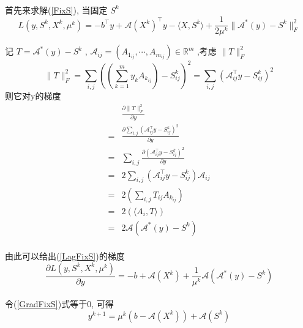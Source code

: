 \documentclass[UTF8]{ctexart}
\numberwithin{equation}{section}
\begin{document}
			\paragraph{}
				\quad 首先来求解(\ref{FixS}), 当固定 $S^k$
				\begin{equation}\label{LagFixS}
						L(y, S^k, X^k, \mu^k)
					=	-b^\top y + \mathcal{A}(X^k)^\top y - \langle{X, S^k}\rangle+ \frac{1}{2\mu^k} \lVert{\mathcal{A}^*(y) - S^k}\rVert^2_F
				\end{equation}

				记 $T = \mathcal{A}^*(y) - S^k$ , $\mathcal{A}_{ij} = (A_{1_{ij}}, \cdots, A_{m_{ij}}) \in \mathbb{R}^{m}$ ,考虑 $\lVert{T}\rVert^2_F$
				\[
						\lVert{T}\rVert^2_F
					=	\sum_{i, j}((\sum^m_{k = 1} y_k A_{k_{ij}}) - S^k_{ij})^2
					=	\sum_{i, j}(\mathcal{A}_{ij}^\top y - S^k_{ij})^2
				\]
				则它对y的梯度
				\begin{equation}
					\begin{aligned}
							& \frac{\partial \lVert{T}\rVert^2_F}{\partial y}\\
						=	& \frac{\partial \sum_{i, j}(\mathcal{A}_{ij}^\top y - S^k_{ij})^2}{\partial y}\\
						=	& \sum_{i, j}\frac{\partial (\mathcal{A}_{ij}^\top y - S^k_{ij})^2}{\partial y} \\
						=	& 2\sum_{i, j}(\mathcal{A}_{ij}^\top y - S^k_{ij}) \mathcal{A}_{ij}\\
						=	& 2(\sum_{i, j}T_{ij} A_{k_{ij}})\\
						=	& 2(\langle{A_i, T}\rangle)\\
						=	& 2\mathcal{A}(\mathcal{A}^*(y) - S^k)
					\end{aligned}
				\end{equation}

			\paragraph{}
				\quad 由此可以给出(\ref{LagFixS})的梯度
				\begin{equation}\label{GradFixS}
						\frac{\partial L(y, S^k, X^k, \mu^k)}{\partial y}
					=	-b + \mathcal{A}(X^k) + \frac{1}{\mu^k} \mathcal{A}(\mathcal{A}^*(y) - S^k)
				\end{equation}

			\paragraph{}
				\quad 令(\ref{GradFixS})式等于0, 可得
				\begin{equation}\label{dualAY}
					y^{k + 1} = \mu^k(b - \mathcal{A}(X^k)) + \mathcal{A}(S^k)
				\end{equation}
\end{document}
